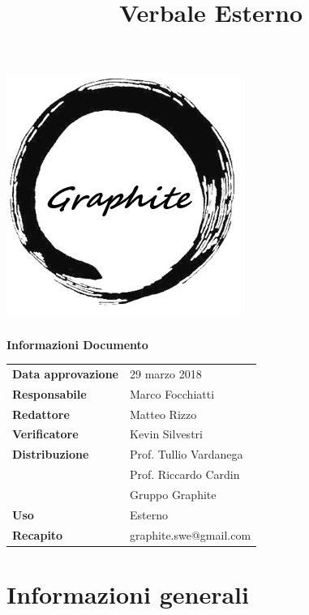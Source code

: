 \documentclass[openany,12pt,a4paper]{article}
\title{Verbale Esterno}
\author{}
\begin{document}
 
  \makeatletter 
  \begin{titlepage} 
    \setlength{\headsep}{0pt}   
    \begin{center} 
      \includegraphics[width=0.5\linewidth]{Logo.png}\\[1em] 
      {\huge \bfseries  \@title }\\[10ex] 
      \textbf{\Large Informazioni Documento} \\[2em] 
      \bgroup 
      \def\arraystretch{1.5} 
      \begin{tabular}{l|l} 
        \textbf{Data approvazione} & 29 marzo 2018 \\ 
        \textbf{Responsabile} & Marco Focchiatti \\ 
        \textbf{Redattore} & Matteo Rizzo \\ 
        \textbf{Verificatore} & Kevin Silvestri \\ 
        \textbf{Distribuzione} & Prof. Tullio Vardanega \\ 
         & Prof. Riccardo Cardin \\ 
         & Gruppo Graphite \\ 
        \textbf{Uso} & Esterno \\ 
        \textbf{Recapito} & graphite.swe@gmail.com \\ 
      \end{tabular} 
    \egroup 
    \end{center} 
  \end{titlepage} 
  \makeatother 
 
  \thispagestyle{empty} 
  \newpage 
   
  \tableofcontents 
  \newpage 
   
  \section{Informazioni generali} 
   
\end{document}
